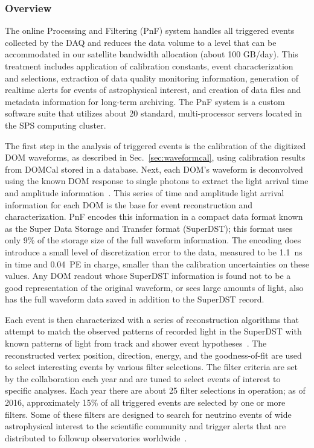 \subsubsection{Overview}

The online Processing and Filtering (PnF) system handles
all triggered events collected by the DAQ
and reduces the data volume to a level that can be accommodated in our
satellite bandwidth allocation (about 100 GB/day).  This treatment
includes application of calibration constants, event
characterization and selections, extraction of data quality monitoring
information, generation of realtime alerts for events of astrophysical
interest, and creation of data files and metadata information for long-term
archiving.  The PnF system is a custom software
suite that utilizes about 20 standard, multi-processor servers located in
the SPS computing cluster.  

The first step in the analysis of triggered events is the calibration of
the digitized DOM waveforms, as described in Sec.~\ref{sec:waveformcal}, using
calibration results from DOMCal stored in a database.  Next, each
DOM's waveform is deconvolved using the known DOM response to single photons to
extract the light arrival time and amplitude information~\cite{IC3:ereco}.
This series of time and amplitude light arrival information for each DOM is
the base for event reconstruction and characterization.  PnF encodes this
information in a compact data format known as the Super Data
Storage and Transfer format (SuperDST); this format uses only 9\% of the storage
size of the full waveform information.  The encoding does introduce a
small level of discretization error to the data, measured to be 1.1~ns in time and
0.04~PE in charge, smaller than the calibration uncertainties on these
values.  Any DOM readout whose SuperDST information is found not to be a
good representation of the original waveform, or sees large amounts of
light, also has the full waveform data saved in addition to the
SuperDST record.


Each event is then characterized with a series of reconstruction
algorithms that attempt to match the observed patterns of recorded light in
the SuperDST with known patterns of light from track and shower event
hypotheses~\cite{IC3:ereco}.  The reconstructed vertex position, direction,
energy, and the goodness-of-fit are used to select interesting events by various
filter selections.  The filter criteria are set by the collaboration
each year and are tuned to select events of interest to specific
analyses.  Each year there are about 25 filter selections in
operation; as of 2016, approximately 15\% of all triggered events are
selected by one or more filters.  Some of these filters are designed to search for
neutrino events of wide astrophysical interest to the scientific community
and trigger alerts that are distributed to followup observatories
worldwide~\cite{Abbasi:2011ja,Aartsen:2015trq}.

